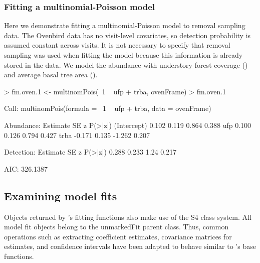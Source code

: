 \documentclass[article,shortnames]{jss}
\newcommand{\um}{\pkg{unmarked}}
\newcommand{\rlang}{\proglang{R}}
\begin{document}



\subsubsection{Fitting a multinomial-Poisson model}

Here we demonstrate fitting a multinomial-Poisson model to removal sampling 
data.  The Ovenbird data has no visit-level covariates, so detection
probability is assumed constant across visits.  It is not necessary
to specify that removal sampling was used when fitting the model
because this information is already stored in the  data.
We model the abundance with understory forest coverage ()
and average basal tree area ().

\begin{Schunk}
\begin{Sinput}
> fm.oven.1 <- multinomPois(~1 ~ ufp + trba, ovenFrame)
> fm.oven.1
\end{Sinput}
\begin{Soutput}
Call:
multinomPois(formula = ~1 ~ ufp + trba, data = ovenFrame)

Abundance:
            Estimate    SE      z P(>|z|)
(Intercept)    0.102 0.119  0.864   0.388
ufp            0.100 0.126  0.794   0.427
trba          -0.171 0.135 -1.262   0.207

Detection:
 Estimate    SE    z P(>|z|)
    0.288 0.233 1.24   0.217

AIC: 326.1387 
\end{Soutput}
\end{Schunk}

\subsection{Examining model fits}
\label{sec:examining-model-fits}

Objects returned by \um's fitting functions also make use of the S4
class system.  All model fit objects belong to the unmarkedFit parent
class.  Thus, common operations such as extracting coefficient
estimates, covariance matrices for estimates, and confidence intervals
have been adapted to behave similar to \rlang's base functions.
\end{document}
